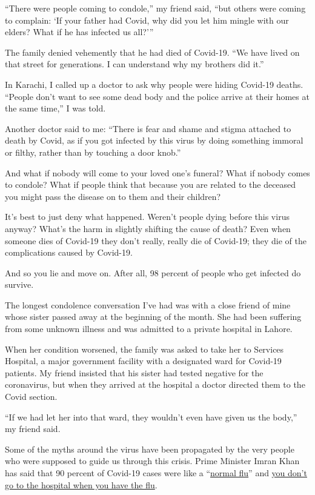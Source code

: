 ``There were people coming to condole,'' my friend said, ``but others
were coming to complain: `If your father had Covid, why did you let him
mingle with our elders? What if he has infected us all?'''

The family denied vehemently that he had died of Covid-19. ``We have
lived on that street for generations. I can understand why my brothers
did it.''

In Karachi, I called up a doctor to ask why people were hiding Covid-19
deaths. ``People don't want to see some dead body and the police arrive
at their homes at the same time,'' I was told.

Another doctor said to me: ``There is fear and shame and stigma attached
to death by Covid, as if you got infected by this virus by doing
something immoral or filthy, rather than by touching a door knob.''

And what if nobody will come to your loved one's funeral? What if nobody
comes to condole? What if people think that because you are related to
the deceased you might pass the disease on to them and their children?

It's best to just deny what happened. Weren't people dying before this
virus anyway? What's the harm in slightly shifting the cause of death?
Even when someone dies of Covid-19 they don't really, really die of
Covid-19; they die of the complications caused by Covid-19.

And so you lie and move on. After all, 98 percent of people who get
infected do survive.

The longest condolence conversation I've had was with a close friend of
mine whose sister passed away at the beginning of the month. She had
been suffering from some unknown illness and was admitted to a private
hospital in Lahore.

When her condition worsened, the family was asked to take her to
Services Hospital, a major government facility with a designated ward
for Covid-19 patients. My friend insisted that his sister had tested
negative for the coronavirus, but when they arrived at the hospital a
doctor directed them to the Covid section.

``If we had let her into that ward, they wouldn't even have given us the
body,'' my friend said.

Some of the myths around the virus have been propagated by the very
people who were supposed to guide us through this crisis. Prime Minister
Imran Khan has said that 90 percent of Covid-19 cases were like a
``\href{https://asia.nikkei.com/Spotlight/Coronavirus/Conspiracy-theories-help-coronavirus-take-root-in-Pakistan}{normal
flu}'' and
\href{https://indianexpress.com/article/trending/trending-globally/pak-pm-imran-khan-coronavirus-address-criticism-6320050/}{you
don't go to the hospital when you have the flu}.

